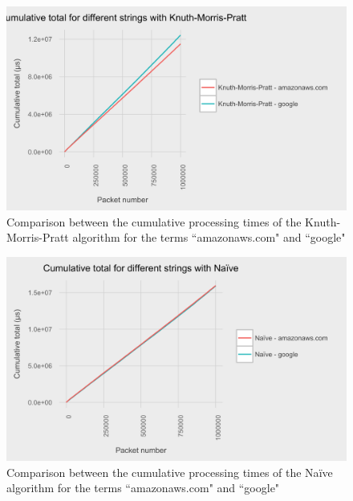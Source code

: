 \documentclass{article}
\begin{document}
\begin{figure}[h!bt]
  \centering
  \includegraphics[width=\textwidth]{graphs/term_length_compare-knuth-morris-pratt.png}
  \caption{Comparison between the cumulative processing times of the Knuth-Morris-Pratt algorithm for the terms ``amazonaws.com" and ``google"}
\end{figure}

\begin{figure}[h!bt]
  \centering
  \includegraphics[width=\textwidth]{graphs/term_length_compare-naive.png}
  \caption{Comparison between the cumulative processing times of the Na{\"i}ve algorithm for the terms ``amazonaws.com" and ``google"}
\end{figure}
\end{document}
